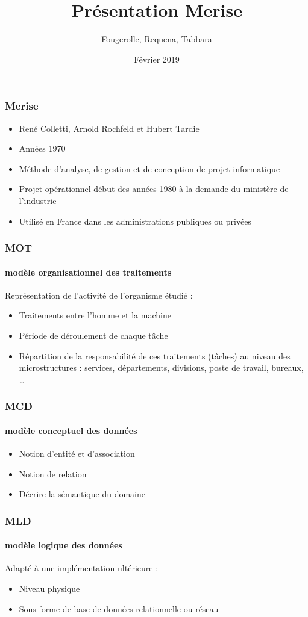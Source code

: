 \documentclass{beamer}
\title{Présentation Merise}
\author{Fougerolle, Requena, Tabbara}
\date{Février 2019}
\begin{document}
\maketitle
\begin{frame}
\frametitle{Merise}
\begin{itemize}
\item René Colletti, Arnold Rochfeld et Hubert Tardie
\item Années 1970
\item Méthode d'analyse, de gestion et de conception de projet informatique
\item Projet opérationnel début des années 1980 à la demande du ministère de l'industrie
\item Utilisé en France dans les administrations publiques ou privées
\end{itemize}
\end{frame}
\begin{frame}
\frametitle{MOT}
\framesubtitle{modèle organisationnel des traitements} 
Représentation de l'activité de l'organisme étudié :
\begin{itemize}
\item Traitements entre l'homme et la machine \item Période de déroulement de chaque tâche
\item Répartition de la responsabilité de ces traitements (tâches) au niveau des microstructures : services, départements, divisions, poste de travail, bureaux, …
\end{itemize}
\end{frame}
\begin{frame}
\frametitle{MCD}
\framesubtitle{modèle conceptuel des données}
\begin{itemize}
\item Notion d'entité et d'association
\item Notion de relation
\item Décrire la sémantique du domaine
\end{itemize}
\end{frame}
\begin{frame}
\frametitle{MLD}
\framesubtitle{modèle logique des données}
Adapté à une implémentation ultérieure :
\begin{itemize}
\item Niveau physique
\item Sous forme de base de données relationnelle ou réseau
\end{itemize}
\end{frame}
\end{document}
